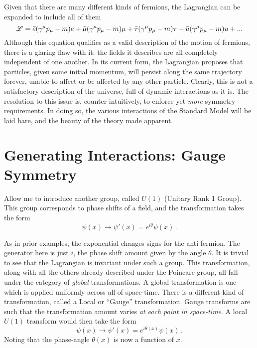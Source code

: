     Given that there are many different kinds of fermions, the Lagrangian can be expanded to include all of them
    \begin{equation}
        \mathscr{L} = \bar{e} (\gamma^\mu p_\mu - m) e
        + \bar{\mu} (\gamma^\mu p_\mu - m) \mu
        + \bar{\tau} (\gamma^\mu p_\mu - m) \tau
        + \bar{u} (\gamma^\mu p_\mu - m) u
        + ...
    \end{equation}
    Although this equation qualifies as a valid description of the motion of fermions,
        there is a glaring flaw with it: the fields it describes are all completely independent of one another.
    In its current form, the Lagrangian proposes that particles, given some initial momentum,
        will persist along the same trajectory forever, unable to affect or be affected by any other particle.
    Clearly, this is not a satisfactory description of the universe, full of dynamic interactions as it is.
    The resolution to this issue is, counter-intuitively, to enforce yet \textit{more} symmetry requirements.
    In doing so, the various interactions of the Standard Model will be laid bare,
        and the beauty of the theory made apparent.



\section{Generating Interactions: Gauge Symmetry} \label{sec:gauge_symmetry}

    Allow me to introduce another group, called $U(1)$ (Unitary Rank 1 Group).
    This group corresponds to phase shifts of a field, and the transformation takes the form
    \begin{equation}
        \psi(x) \to \psi'(x) = e^{i\theta} \psi(x)
        \,.
    \end{equation}

    As in prior examples, the exponential changes signs for the anti-fermion.
    The generator here is just $i$, the phase shift amount given by the angle $\theta$.
    It is trivial to see that the Lagrangian is invariant under such a group.
    This transformation, along with all the others already described under the Poincare group,
        all fall under the category of \textit{global} transformations.
    A global transformation is one which is applied uniformly across all of space-time.
    There is a different kind of transformation, called a Local or ``Gauge'' transformation.
    Gauge transforms are such that the transformation amount varies \textit{at each point in space-time}.
    A local $U(1)$ transform would then take the form 
    \begin{equation}
        \psi(x) \to \psi'(x) = e^{i\theta(x)} \psi(x)
        \,.
    \end{equation}
    Noting that the phase-angle $\theta(x)$ is now a function of $x$.

